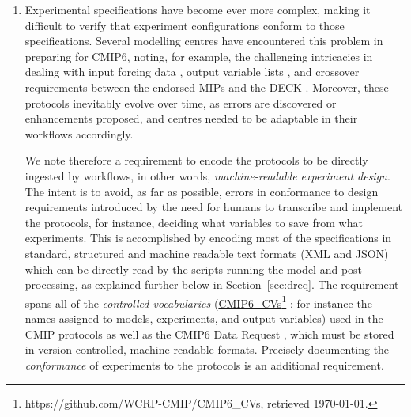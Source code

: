 \documentclass[gmd,manuscript]{copernicus}
\begin{document}
\begin{enumerate}
\item\label{cmplx} Experimental specifications have become ever more
  complex, making it difficult to verify that experiment
  configurations conform to those specifications. Several modelling
  centres have encountered this problem in preparing for CMIP6,
  noting, for example, the challenging intricacies in dealing with
  input forcing data \citep[see][]{ref:duracketal2018}, output
  variable lists \citep{ref:juckesetal2015}, and crossover
  requirements between the endorsed MIPs and the DECK
  \citep{ref:eyringetal2016a} . Moreover, these protocols inevitably
  evolve over time, as errors are discovered or enhancements proposed,
  and centres needed to be adaptable in their workflows accordingly.
   
  We note therefore a requirement to encode the protocols to be
  directly ingested by workflows, in other words,
  \emph{machine-readable experiment design}. The intent is to avoid,
  as far as possible, errors in conformance to design requirements
  introduced by the need for humans to transcribe and implement the
  protocols, for instance, deciding what variables to save from what
  experiments. This is accomplished by encoding most of the
  specifications in standard, structured and machine readable text
  formats (XML and JSON) which can be directly read by the scripts
  running the model and post-processing, as explained further below in
  Section~\ref{sec:dreq}. The requirement spans all of the
  \emph{controlled vocabularies}
  (\href{https://github.com/WCRP-CMIP/CMIP6_CVs}{CMIP6\_CVs}\footnote{https://github.com/WCRP-CMIP/CMIP6\_CVs,
    retrieved \today.} : for instance the names assigned to models,
  experiments, and output variables) used in the CMIP protocols as
  well as the CMIP6 Data Request \citep{ref:juckesetal2015}, which
  must be stored in version-controlled, machine-readable formats.
  Precisely documenting the \emph{conformance} of experiments to the
  protocols \citep{ref:lawrenceetal2012} is an additional requirement.
  

\end{enumerate}
\end{document}

